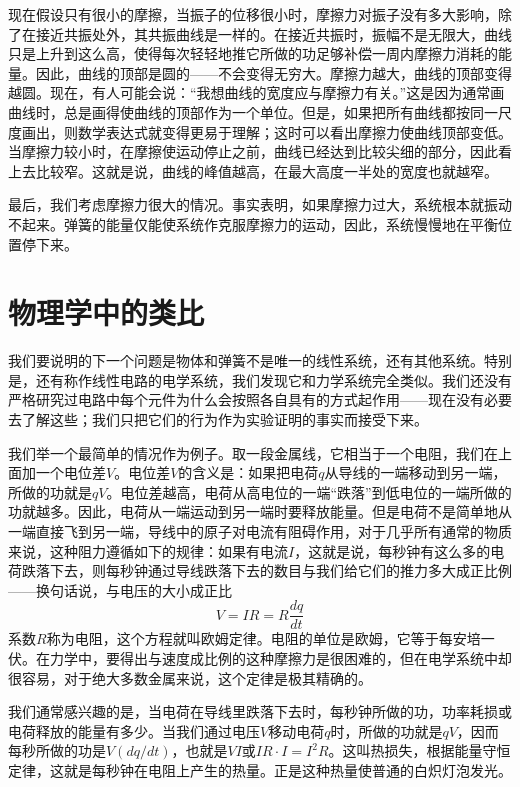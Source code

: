 现在假设只有很小的摩擦，当振子的位移很小时，摩擦力对振子没有多大影响，除了在接近共振处外，其共振曲线是一样的。在接近共振时，振幅不是无限大，曲线只是上升到这么高，使得每次轻轻地推它所做的功足够补偿一周内摩擦力消耗的能量。因此，曲线的顶部是圆的——不会变得无穷大。摩擦力越大，曲线的顶部变得越圆。现在，有人可能会说：“我想曲线的宽度应与摩擦力有关。”这是因为通常画曲线时，总是画得使曲线的顶部作为一个单位。但是，如果把所有曲线都按同一尺度画出，则数学表达式就变得更易于理解；这时可以看出摩擦力使曲线顶部变低。当摩擦力较小时，在摩擦使运动停止之前，曲线已经达到比较尖细的部分，因此看上去比较窄。这就是说，曲线的峰值越高，在最大高度一半处的宽度也就越窄。

最后，我们考虑摩擦力很大的情况。事实表明，如果摩擦力过大，系统根本就振动不起来。弹簧的能量仅能使系统作克服摩擦力的运动，因此，系统慢慢地在平衡位置停下来。

\section{物理学中的类比}

我们要说明的下一个问题是物体和弹簧不是唯一的线性系统，还有其他系统。特别是，还有称作线性电路的电学系统，我们发现它和力学系统完全类似。我们还没有严格研究过电路中每个元件为什么会按照各自具有的方式起作用——现在没有必要去了解这些；我们只把它们的行为作为实验证明的事实而接受下来。

我们举一个最简单的情况作为例子。取一段金属线，它相当于一个电阻，我们在上面加一个电位差$V$。电位差$V$的含义是：如果把电荷$q$从导线的一端移动到另一端，所做的功就是$qV$。电位差越高，电荷从高电位的一端“跌落”到低电位的一端所做的功就越多。因此，电荷从一端运动到另一端时要释放能量。但是电荷不是简单地从一端直接飞到另一端，导线中的原子对电流有阻碍作用，对于几乎所有通常的物质来说，这种阻力遵循如下的规律：如果有电流$I$，这就是说，每秒钟有这么多的电荷跌落下去，则每秒钟通过导线跌落下去的数目与我们给它们的推力多大成正比例——换句话说，与电压的大小成正比
\begin{equation}
    \label{Eq:I:25:11}
    V=IR=R\frac{dq}{dt}
\end{equation}
系数$R$称为电阻，这个方程就叫欧姆定律。电阻的单位是欧姆，它等于每安培一伏。在力学中，要得出与速度成比例的这种摩擦力是很困难的，但在电学系统中却很容易，对于绝大多数金属来说，这个定律是极其精确的。

我们通常感兴趣的是，当电荷在导线里跌落下去时，每秒钟所做的功，功率耗损或电荷释放的能量有多少。当我们通过电压$V$移动电荷$q$时，所做的功就是$qV$，因而每秒所做的功是$V(dq/dt)$，也就是$VI$或$IR\cdot I=I^2R$。这叫热损失，根据能量守恒定律，这就是每秒钟在电阻上产生的热量。正是这种热量使普通的白炽灯泡发光。

